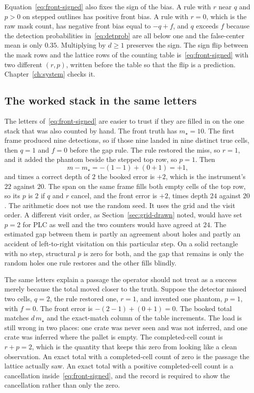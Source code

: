 Equation~\eqref{eq:front-signed} also fixes the sign of the bias. A rule with $r$ near $q$ and $p>0$ on stepped outlines has positive front bias. A rule with $r=0$, which is the raw mask count, has negative front bias equal to $-q+f$, and $q$ exceeds $f$ because the detection probabilities in~\eqref{eq:detprob} are all below one and the false-center mean is only $0.35$. Multiplying by $d\ge 1$ preserves the sign. The sign flip between the mask rows and the lattice rows of the counting table is~\eqref{eq:front-signed} with two different $(r,p)$, written before the table so that the flip is a prediction. Chapter~\ref{ch:system} checks it.

\subsection{The worked stack in the same letters}
\label{sec:letters}

The letters of~\eqref{eq:front-signed} are easier to trust if they are filled in on the one stack that was also counted by hand. The front truth has $m_{\star}=10$. The first frame produced nine detections, so if those nine landed in nine distinct true cells, then $q=1$ and $f=0$ before the gap rule. The rule restored the miss, so $r=1$, and it added the phantom beside the stepped top row, so $p=1$. Then
\begin{equation}
m-m_{\star} = -(1-1) + (0+1) = +1,
\label{eq:letters-num}
\end{equation}
and times a correct depth of $2$ the booked error is $+2$, which is the instrument's $22$ against $20$. The span on the same frame fills both empty cells of the top row, so its $p$ is $2$ if $q$ and $r$ cancel, and the front error is $+2$, times depth $24$ against $20$. The arithmetic does not use the random seed. It uses the grid and the visit order. A different visit order, as Section~\ref{sec:grid-drawn} noted, would have set $p=2$ for PLC as well and the two counters would have agreed at $24$. The estimated gap between them is partly an agreement about holes and partly an accident of left-to-right visitation on this particular step. On a solid rectangle with no step, structural $p$ is zero for both, and the gap that remains is only the random holes one rule restores and the other fills blindly.

The same letters explain a passage the operator should not treat as a success merely because the total moved closer to the truth. Suppose the detector missed two cells, $q=2$, the rule restored one, $r=1$, and invented one phantom, $p=1$, with $f=0$. The front error is $-(2-1)+(0+1)=0$. The booked total matches $d\,m_{\star}$ and the exact-match column of the table increments. The load is still wrong in two places: one crate was never seen and was not inferred, and one crate was inferred where the pallet is empty. The completed-cell count is $r+p=2$, which is the quantity that keeps this zero from looking like a clean observation. An exact total with a completed-cell count of zero is the passage the lattice actually saw. An exact total with a positive completed-cell count is a cancellation inside~\eqref{eq:front-signed}, and the record is required to show the cancellation rather than only the zero.

